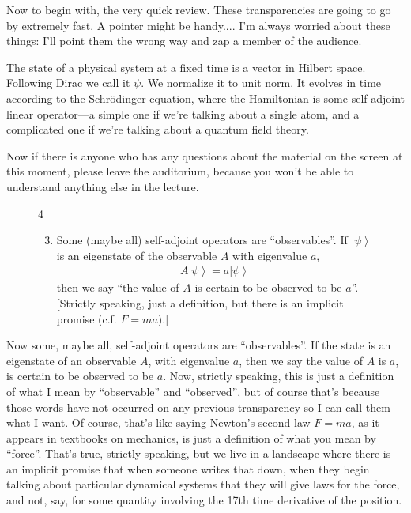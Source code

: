 \documentclass[12pt,nofootinbib]{revtex4}
\newcommand{\ket}[1]{\left|#1\right\rangle}
\begin{document}
Now to begin with, the very quick review. These transparencies are going to go by extremely fast. A pointer might be handy.... I'm always worried about these things: I'll point them the wrong way and zap a member of the audience. %

The state of a physical system at a fixed time is a vector in Hilbert space. Following Dirac we call it $\psi$. We normalize it to unit norm. It evolves in time according to the Schrödinger equation, where the Hamiltonian is some self-adjoint linear operator---a simple one if we're talking about a single atom, and a complicated one if we're talking about a quantum field theory.

Now if there is anyone who has any questions about the material on the screen at this moment, please leave the auditorium, because you won't be able to understand anything else in the lecture.

\begin{figure}[htb] 
\begin{mdframed}
  \vspace{5pt}\hfill 4\\[-18pt]
  \begin{raggedright}
  \begin{enumerate}[label=(\roman*)]
    \setcounter{enumi}{2}
  \item Some (maybe all) self-adjoint operators are ``observables''.  If 
    $\ket{\psi}$ is an eigenstate of the observable $A$ with eigenvalue $a$,
    \begin{align}
      \nonumber
      A\ket{\psi} = a\ket{\psi}
    \end{align}
    then we say ``the value of $A$ is certain to be observed to be
    $a$''.\\[6pt]

    [Strictly speaking, just a definition, but there is an implicit
      promise (c.f. $F=ma$).]
  \end{enumerate}
  \end{raggedright}
  \vspace{6pt}
\end{mdframed}
\end{figure}

Now some, maybe all, self-adjoint operators are ``observables''. If the state is an eigenstate of an observable $A$, with eigenvalue $a$, then we say the value of $A$ is $a$, is certain to be observed to be $a$. Now, strictly speaking, this is just a definition of what I mean by ``observable'' and ``observed'', but of course that's because those words have not occurred on any previous transparency so I can call them what I want. Of course, that's like saying Newton's second law
$F = ma$, as it appears in textbooks on mechanics, is just a definition of what you mean by ``force''. That's true, strictly speaking, but we live in a landscape where there is an implicit promise that when someone writes that down, when they begin talking about particular dynamical systems that they will give laws for the force, and not, say, for some quantity involving the 17th time derivative of the position.
\end{document}
